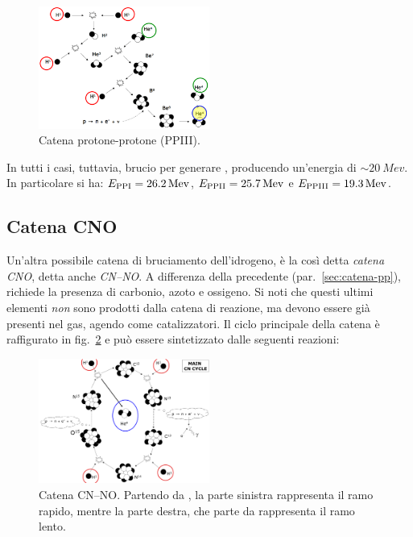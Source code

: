 \begin{figure}
    \centering
    \includegraphics[width=0.5\textwidth]{immagini/catena-pp3.png}
    \caption{Catena protone-protone (PPIII).}
    \label{fig:catena-pp3}
\end{figure}

In tutti i casi, tuttavia, brucio  per generare , producendo un'energia di $\sim \SI{20}{Mev}$. In particolare si ha: $E_\textup{PPI} = \SI{26.2}{Mev}$, $E_\textup{PPII} = \SI{25.7}{Mev}$ e $E_\textup{PPIII} = \SI{19.3}{Mev}$. 

\subsection{Catena CNO}\label{sec:catena-cno}
Un'altra possibile catena di bruciamento dell'idrogeno, è la così detta \emph{catena CNO}, detta anche \emph{CN--NO}. A differenza della precedente (par.~\ref{sec:catena-pp}), richiede la presenza di carbonio, azoto e ossigeno. Si noti che questi ultimi elementi \emph{non} sono prodotti dalla catena di reazione, ma devono essere già presenti nel gas, agendo come catalizzatori. Il ciclo principale della catena è raffigurato in fig.~\ref{fig:catena-cno} e può essere sintetizzato dalle seguenti reazioni:

\begin{figure}
    \centering
    \includegraphics[width=0.5\textwidth]{immagini/catena-cno.png}
    \caption{Catena CN--NO. Partendo da , la parte sinistra rappresenta il ramo rapido, mentre la parte destra, che parte da  rappresenta il ramo lento.}
    \label{fig:catena-cno}
\end{figure}

